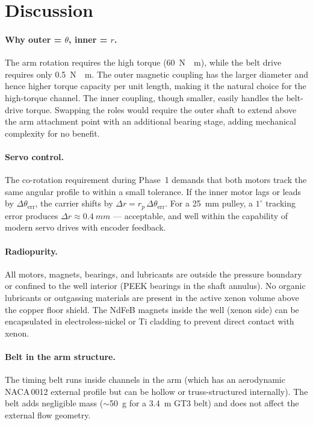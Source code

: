\documentclass[11pt,a4paper]{article}
\begin{document}
\section{Discussion}
\label{sec:discussion}

\paragraph{Why outer = $\theta$, inner = $r$.}
The arm rotation requires the high torque (\SI{60}{N\cdot m}), while
the belt drive requires only \SI{0.5}{N\cdot m}. The outer magnetic
coupling has the larger diameter and hence higher torque capacity per
unit length, making it the natural choice for the high-torque channel.
The inner coupling, though smaller, easily handles the belt-drive torque.
Swapping the roles would require the outer shaft to extend above the arm
attachment point with an additional bearing stage, adding mechanical
complexity for no benefit.

\paragraph{Servo control.}
The co-rotation requirement during Phase~1 demands that both motors
track the same angular profile to within a small tolerance. If the
inner motor lags or leads by $\Delta\theta_\mathrm{err}$, the carrier
shifts by $\Delta r = r_p\,\Delta\theta_\mathrm{err}$. For a
\SI{25}{mm} pulley, a $1^\circ$ tracking error produces
$\Delta r \approx \SI{0.4}{mm}$ --- acceptable, and well within
the capability of modern servo drives with encoder feedback.

\paragraph{Radiopurity.}
All motors, magnets, bearings, and lubricants are outside the pressure
boundary or confined to the well interior (PEEK bearings in the shaft
annulus). No organic lubricants or outgassing materials are present
in the active xenon volume above the copper floor shield. The NdFeB
magnets inside the well (xenon side) can be encapsulated in
electroless-nickel or Ti cladding to prevent direct contact with xenon.

\paragraph{Belt in the arm structure.}
The timing belt runs inside channels in the arm (which has an
aerodynamic NACA\,0012 external profile but can be hollow or
truss-structured internally). The belt adds negligible mass
($\sim$\SI{50}{g} for a \SI{3.4}{m} GT3 belt) and does not affect
the external flow geometry.
\end{document}

